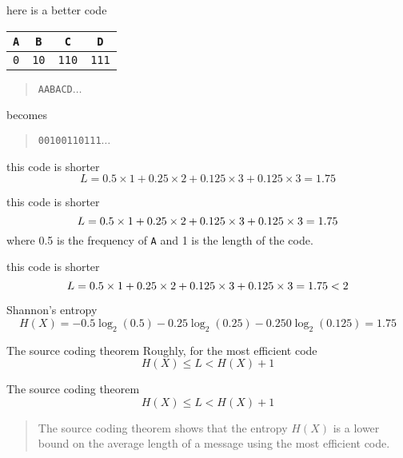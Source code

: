 \documentclass{beamer}
\newcommand{\crish}{\color{reddish}}
\newcommand{\cbla}{\color{black}}
\newcommand{\cred}{\color{red}}
\newcommand{\cblu}{\color{blue}}
\newcommand{\cgre}{\color{green}}
\newcommand{\letter}[1]{\color{blue}\texttt{#1}\color{black}}
\newcommand{\binary}[1]{\color{red}\texttt{#1}\color{black}}
\begin{document}
\begin{frame}{here is a better code}
\begin{center}
\begin{tabular}{cccc}
\letter{A}&\letter{B}&\letter{C}&\letter{D}\\
\hline
\binary{0}&\binary{10}&\binary{110}&\binary{111}
\end{tabular}
\end{center}
  \begin{quote}
    \letter{AABAC\cgre D\cblu{}}$\ldots$
  \end{quote}
  becomes
    \begin{quote}
    \binary{00100110\cgre 111\cred{}}$\ldots$
    \end{quote}
\end{frame}  

\begin{frame}{this code is shorter}
  \crish
  $$
  L=0.5\times 1 +0.25\times 2 + 0.125\times 3 +
0.125\times 3=1.75
$$
\cbla
\end{frame}



\begin{frame}{this code is shorter}
  \crish
  $$
  L=\cgre 0.5\cbla \times \cred 1\crish +0.25\times 2 + 0.125\times 3 +
0.125\times 3=1.75
$$
\cbla
where \cgre 0.5\cbla{} is the frequency of \letter{A}{} and \cred 1\cbla{} is the length of the code.
\end{frame}


\begin{frame}{this code is shorter}
  \crish
  $$
  L=0.5\times 1 +0.25\times 2 + 0.125\times 3 +
0.125\times 3=\cgre 1.75 < 2
$$
\cbla
\end{frame}


\begin{frame}{Shannon's entropy}
  \crish
  $$
H(X)=-0.5\log_2(0.5)-0.25\log_2(0.25)-0.250\log_2(0.125)=1.75
$$
\cbla
\end{frame}

\begin{frame}{The source coding theorem}
Roughly, for the most efficient code
  \crish
  $$
H(X)\le L < H(X)+1
$$
\cbla
\end{frame}


\begin{frame}{The source coding theorem}
  \crish
  $$
H(X)\le L < H(X)+1
$$
\cbla
\begin{quote}
  The source coding theorem shows that the entropy $H(X)$ is a lower
  bound on the average length of a message using the most efficient
  code.
\end{quote}
\end{frame}
\end{document}
